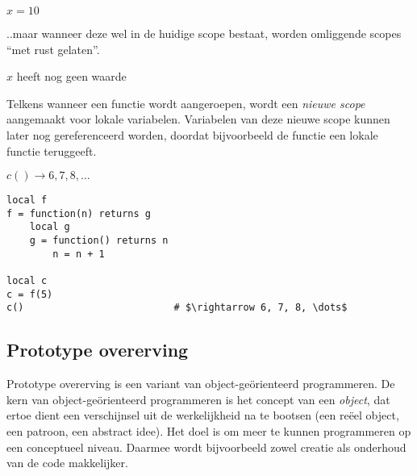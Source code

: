   \begin{CodeFragment}\label{exa:lexical}
		                      {}
		       {}
		               {}
		\Line{}                            {}
		                        {$x = 10$}
	\end{CodeFragment}

..maar wanneer deze wel in de huidige scope bestaat, worden omliggende scopes ``met rust gelaten''.

	\begin{CodeFragment}
		                      {}
		                      {}
		                 {}
		                  {}
		               {}
		\Line{}                            {}
		                        {$x$ heeft nog geen waarde}
	\end{CodeFragment}

Telkens wanneer een functie wordt aangeroepen, wordt een \emph{nieuwe scope} aangemaakt voor lokale variabelen. Variabelen van deze nieuwe scope kunnen later nog gereferenceerd worden, doordat bijvoorbeeld de functie een lokale functie teruggeeft.

	\begin{CodeFragment}
		                      {}
		      {}
		                  {}
		   {}
		           {}
		\Line{}                            {}
		                      {}
		                    {$c() \rightarrow 6, 7, 8, \dots$}
	\end{CodeFragment}

\begin{lstlisting}[caption=Een countervoorbeeld,label=exa:counter]
local f
f = function(n) returns g
    local g
    g = function() returns n
        n = n + 1

local c
c = f(5)
c()                          # $\rightarrow 6, 7, 8, \dots$
\end{lstlisting}


\subsection{Prototype overerving}

Prototype overerving is een variant van object-geörienteerd programmeren. De kern van object-geörienteerd programmeren is het concept van een \emph{object}, dat ertoe dient een verschijnsel uit de werkelijkheid na te bootsen (een reëel object, een patroon, een abstract idee). Het doel is om meer te kunnen programmeren op een conceptueel niveau. Daarmee wordt bijvoorbeeld zowel creatie als onderhoud van de code makkelijker.

